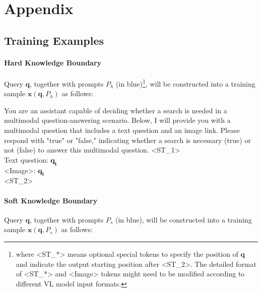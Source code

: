 \clearpage
\newpage

\section{Appendix}
\label{appendix}


\subsection{Training Examples}
\label{training_example_appendix_section}

\paragraph{Hard Knowledge Boundary} Query $\bm{q}$, together with prompts $P_h$ (in blue)\footnote{where <ST\_*> means optional special tokens to specify the position of $\bm{q}$ and indicate the output starting position after <ST\_2>. The detailed format of <ST\_*> and <Image> tokens might need to be modified according to different VL model input formats.}, will be constructed into a training sample $\bm{x}(\bm{q}, P_h)$ as follows:
\begin{framed}
\noindent\textcolor[rgb]{0.392, 0.471, 0.871}{You are an assistant capable of deciding whether a search is needed in a multimodal question-answering scenario. Below, I will provide you with a multimodal question that includes a text question and an image link.
Please respond with "true" or "false," indicating whether a search is necessary (true) or not (false) to answer this multimodal question.
<ST\_1> \\
Text question: \textcolor{black}{$\bm{q_t}$} \\
<Image>: \textcolor{black}{$\bm{q_i}$} \\
<ST\_2>}
\end{framed}


\paragraph{Soft Knowledge Boundary} Query $\bm{q}$, together with prompts $P_s$ (in blue), will be constructed into a training sample $\bm{x}(\bm{q}, P_s)$ as follows: 

